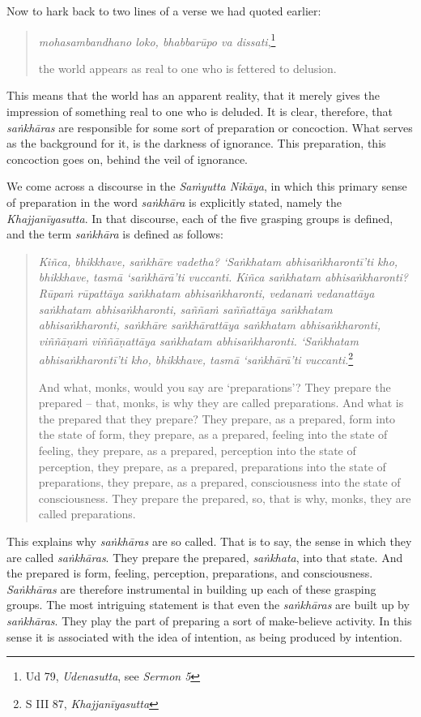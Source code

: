 Now to hark back to two lines of a verse we had quoted earlier:

\begin{quote}
\emph{mohasambandhano loko, bhabbarūpo va dissati},\footnote{Ud 79, \emph{Udenasutta}, see \emph{Sermon 5}}

the world appears as real to one who is fettered to delusion.
\end{quote}

This means that the world has an apparent reality, that it merely gives the impression of something real to one who is deluded. It is clear, therefore, that \emph{saṅkhāras} are responsible for some sort of preparation or concoction. What serves as the background for it, is the darkness of ignorance. This preparation, this concoction goes on, behind the veil of ignorance.

We come across a discourse in the \emph{Saṁyutta Nikāya}, in which this primary sense of preparation in the word \emph{saṅkhāra} is explicitly stated, namely the \emph{Khajjanīyasutta}. In that discourse, each of the five grasping groups is defined, and the term \emph{saṅkhāra} is defined as follows:

\clearpage

\begin{quote}
\emph{Kiñca, bhikkhave, saṅkhāre vadetha? `Saṅkhatam abhisaṅkharontī'ti kho, bhikkhave, tasmā `saṅkhārā'ti vuccanti. Kiñca saṅkhatam abhisaṅkharonti? Rūpaṁ rūpattāya saṅkhatam abhisaṅkharonti, vedanaṁ vedanattāya saṅkhatam abhisaṅkharonti, saññaṁ saññattāya saṅkhatam abhisaṅkharonti, saṅkhāre saṅkhārattāya saṅkhatam abhisaṅkharonti, viññāṇaṁ viññāṇattāya saṅkhatam abhisaṅkharonti. `Saṅkhatam abhisaṅkharontī'ti kho, bhikkhave, tasmā `saṅkhārā'ti vuccanti.}\footnote{S III 87, \emph{Khajjanīyasutta}}

And what, monks, would you say are `preparations'? They prepare the prepared -- that, monks, is why they are called preparations. And what is the prepared that they prepare? They prepare, as a prepared, form into the state of form, they prepare, as a prepared, feeling into the state of feeling, they prepare, as a prepared, perception into the state of perception, they prepare, as a prepared, preparations into the state of preparations, they prepare, as a prepared, consciousness into the state of consciousness. They prepare the prepared, so, that is why, monks, they are called preparations.
\end{quote}

This explains why \emph{saṅkhāras} are so called. That is to say, the sense in which they are called \emph{saṅkhāras}. They prepare the prepared, \emph{saṅkhata}, into that state. And the prepared is form, feeling, perception, preparations, and consciousness. \emph{Saṅkhāras} are therefore instrumental in building up each of these grasping groups. The most intriguing statement is that even the \emph{saṅkhāras} are built up by \emph{saṅkhāras}. They play the part of preparing a sort of make-believe activity. In this sense it is associated with the idea of intention, as being produced by intention.

